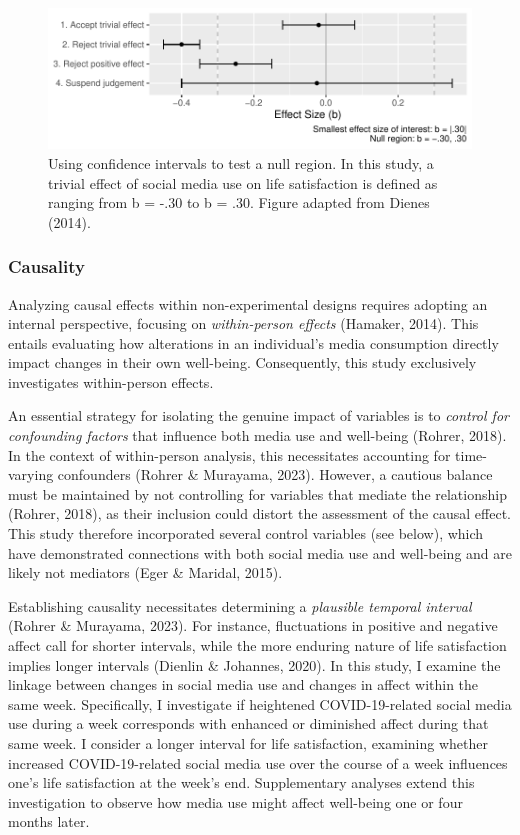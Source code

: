 \documentclass[
  man,mask,floatsintext]{apa7}
\begin{document}
\begin{figure}
\centering
\includegraphics{manuscript_files/figure-latex/sesoi-1.pdf}
\caption{\label{fig:sesoi}Using confidence intervals to test a null region. In this study, a trivial effect of social media use on life satisfaction is defined as ranging from b = -.30 to b = .30. Figure adapted from Dienes (2014).}
\end{figure}

\subsubsection{Causality}\label{causality}

Analyzing causal effects within non-experimental designs requires adopting an internal perspective, focusing on \emph{within-person effects} (Hamaker, 2014).
This entails evaluating how alterations in an individual's media consumption directly impact changes in their own well-being.
Consequently, this study exclusively investigates within-person effects.

An essential strategy for isolating the genuine impact of variables is to \emph{control for confounding factors} that influence both media use and well-being (Rohrer, 2018).
In the context of within-person analysis, this necessitates accounting for time-varying confounders (Rohrer \& Murayama, 2023).
However, a cautious balance must be maintained by not controlling for variables that mediate the relationship (Rohrer, 2018), as their inclusion could distort the assessment of the causal effect.
This study therefore incorporated several control variables (see below), which have demonstrated connections with both social media use and well-being and are likely not mediators (Eger \& Maridal, 2015).

Establishing causality necessitates determining a \emph{plausible temporal interval} (Rohrer \& Murayama, 2023).
For instance, fluctuations in positive and negative affect call for shorter intervals, while the more enduring nature of life satisfaction implies longer intervals (Dienlin \& Johannes, 2020).
In this study, I examine the linkage between changes in social media use and changes in affect within the same week.
Specifically, I investigate if heightened COVID-19-related social media use during a week corresponds with enhanced or diminished affect during that same week.
I consider a longer interval for life satisfaction, examining whether increased COVID-19-related social media use over the course of a week influences one's life satisfaction at the week's end.
Supplementary analyses extend this investigation to observe how media use might affect well-being one or four months later.
\end{document}
